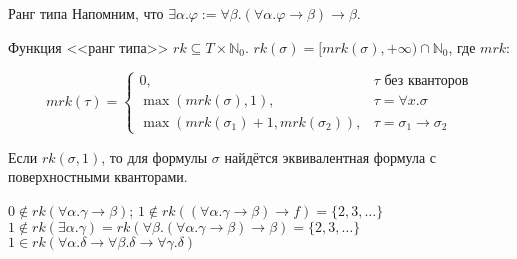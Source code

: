 \documentclass[aspectratio=169]{beamer}
\begin{document}
\begin{frame}{Ранг типа}
Напомним, что $\exists\alpha.\varphi := \forall \beta.(\forall\alpha.\varphi\rightarrow\beta)\rightarrow\beta$.
\begin{dfn}Функция <<ранг типа>> $rk \subseteq T \times \mathbb{N}_0$. $rk(\sigma) = [mrk(\sigma),+\infty)\cap\mathbb{N}_0$, где $mrk$:

$$mrk(\tau)=\left\{\begin{array}{ll}
0, &\tau \text{ без кванторов}\\
\max(mrk(\sigma),1), &\tau = \forall x.\sigma\\
\max(mrk(\sigma_1)+1,mrk(\sigma_2)), & \tau = \sigma_1\rightarrow\sigma_2
\end{array}\right.
$$
\end{dfn}\vspace{-0.5cm}

\begin{lmm}
Если $rk(\sigma,1)$, то для формулы $\sigma$ найдётся эквивалентная формула с поверхностными кванторами.
\end{lmm}

\begin{exm}
$0 \notin rk(\forall\alpha.\gamma\rightarrow\beta)$; $1 \notin rk((\forall\alpha.\gamma\rightarrow\beta)\rightarrow f)=\{2,3,\dots\}$\\
$1 \notin rk(\exists\alpha.\gamma) = rk(\forall\beta.(\forall\alpha.\gamma\rightarrow\beta)\rightarrow\beta) = \{2,3,\dots\}$\\
$1 \in rk(\forall\alpha.\delta\rightarrow\forall\beta.\delta\rightarrow\forall\gamma.\delta)$
\end{exm}

\end{frame}
\end{document}
